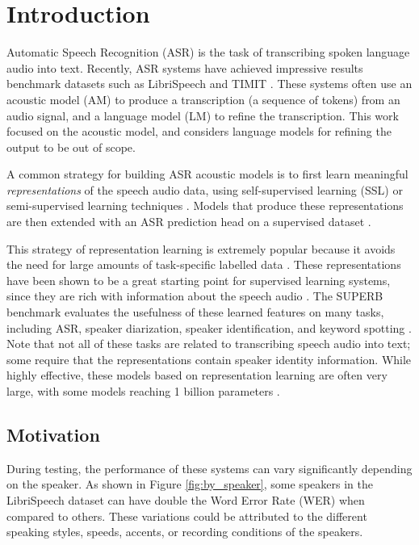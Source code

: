 \section{Introduction}
\label{sec:introduction}

Automatic Speech Recognition (ASR) is the task of transcribing spoken language audio into text.
Recently, ASR systems have achieved impressive results benchmark datasets such as LibriSpeech \cite{librispeech} and TIMIT \cite{timit}.
These systems often use an acoustic model (AM) to produce a transcription (a sequence of tokens) from an audio signal, and a language model (LM) to refine the transcription.
This work focused on the acoustic model, and considers language models for refining the output to be out of scope.

A common strategy for building ASR acoustic models is to first learn meaningful \textit{representations} of the speech audio data, using self-supervised learning (SSL) or semi-supervised learning techniques \cite{hubert, npc, conformerxll}.
Models that produce these representations are then extended with an ASR prediction head on a supervised dataset \cite{wav2vec2, conformerxll}.

This strategy of representation learning is extremely popular because it avoids the need for large amounts of task-specific labelled data \cite{wav2vec}.
These representations have been shown to be a great starting point for supervised learning systems, since they are rich with information about the speech audio \cite{comparative, layerwise}.
The SUPERB benchmark evaluates the usefulness of these learned features on many tasks, including ASR, speaker diarization, speaker identification, and keyword spotting \cite{superb}.
Note that not all of these tasks are related to transcribing speech audio into text; some require that the representations contain speaker identity information.
While highly effective, these models based on representation learning are often very large, with some models reaching 1 billion parameters \cite{conformerxll}.


\subsection{Motivation}

During testing, the performance of these systems can vary significantly depending on the speaker.
As shown in Figure \ref{fig:by_speaker}, some speakers in the LibriSpeech dataset can have double the Word Error Rate (WER) when compared to others.
These variations could be attributed to the different speaking styles, speeds, accents, or recording conditions of the speakers.

